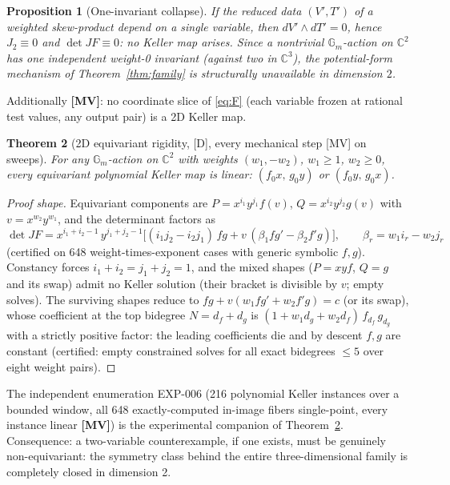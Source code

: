 \documentclass[11pt]{article}
\newtheorem{theorem}{Theorem}[section]
\newtheorem{proposition}[theorem]{Proposition}
\theoremstyle{definition}
\theoremstyle{remark}
\newcommand{\C}{\mathbb{C}}
\newcommand{\Gm}{\mathbb{G}_m}
\newcommand{\detJ}{\det JF}
\begin{document}
\begin{proposition}[One-invariant collapse]\label{prop:collapse}
If the reduced data $(V', T')$ of a weighted skew-product depend on a single variable, then
$dV' \wedge dT' = 0$, hence $J_2 \equiv 0$ and $\detJ \equiv 0$: no Keller map arises. Since a
nontrivial $\Gm$-action on $\C^2$ has one independent weight-0 invariant (against two in
$\C^3$), the potential-form mechanism of Theorem~\ref{thm:family} is structurally unavailable in
dimension $2$.
\end{proposition}

Additionally \textbf{[MV]}: no coordinate slice of \eqref{eq:F} (each variable frozen at rational
test values, any output pair) is a 2D Keller map.

\begin{theorem}[2D equivariant rigidity, {[D]}, every mechanical step {[MV]} on sweeps]
\label{thm:rigidity}
For any $\Gm$-action on $\C^2$ with weights $(w_1, -w_2)$, $w_1 \ge 1$, $w_2 \ge 0$, every
equivariant polynomial Keller map is linear: $(f_0 x,\, g_0 y)$ or $(f_0 y,\, g_0 x)$.
\end{theorem}

\begin{proof}[Proof shape]
Equivariant components are $P = x^{i_1} y^{j_1} f(v)$, $Q = x^{i_2} y^{j_2} g(v)$ with
$v = x^{w_2} y^{w_1}$, and the determinant factors as
\[
\detJ = x^{i_1 + i_2 - 1}\, y^{j_1 + j_2 - 1}
\bigl[ (i_1 j_2 - i_2 j_1)\, f g + v\,(\beta_1 f g' - \beta_2 f' g) \bigr],
\qquad \beta_r = w_1 i_r - w_2 j_r
\]
(certified on 648 weight-times-exponent cases with generic symbolic $f, g$). Constancy forces
$i_1 + i_2 = j_1 + j_2 = 1$, and the mixed shapes ($P = xy f$, $Q = g$ and its swap) admit no
Keller solution (their bracket is divisible by $v$; empty solves). The surviving shapes reduce
to $fg + v(w_1 f g' + w_2 f' g) = c$ (or its swap), whose coefficient at the top bidegree
$N = d_f + d_g$ is $(1 + w_1 d_g + w_2 d_f)\, f_{d_f}\, g_{d_g}$ with a strictly positive
factor: the leading coefficients die and by descent $f, g$ are constant (certified: empty
constrained solves for all exact bidegrees $\le 5$ over eight weight pairs).
\end{proof}

The independent enumeration EXP-006 (216 polynomial Keller instances over a bounded window, all
648 exactly-computed in-image fibers single-point, every instance linear \textbf{[MV]}) is the
experimental companion of Theorem~\ref{thm:rigidity}. Consequence: a two-variable
counterexample, if one exists, must be genuinely non-equivariant: the symmetry class behind the
entire three-dimensional family is completely closed in dimension 2.
\end{document}
